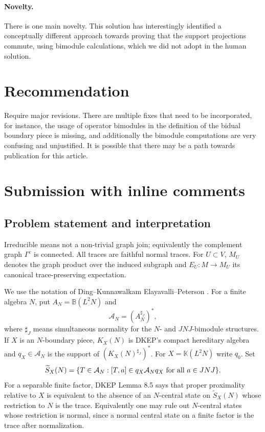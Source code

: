 \documentclass[12pt]{article}
\newcommand{\cA}{\mathcal A}
\begin{document}
\paragraph{Novelty.}
There is one main novelty. This solution has interestingly identified a conceptually different approach towards proving that the support projections commute, using bimodule calculations, which we did not adopt in the human solution. 
\section{Recommendation}
Require major revisions. There are multiple fixes that need to be incorporated, for instance, the usage of operator bimodules in the definition of the bidual boundary piece is missing, and additionally the bimodule computations  are very confusing and unjustified. It is possible that there may be a path towards publication for this article.


  \section{Submission with inline comments}


\date{}



\subsection*{Problem statement and interpretation}

Irreducible means not a non-trivial graph join; equivalently the complement
graph \(\Gamma^c\) is connected.  All traces are faithful normal traces.  For
\(U\subset V\), \(M_U\) denotes the graph product over the induced subgraph and
\(E_U:M\to M_U\) its canonical trace-preserving expectation.

We use the notation of Ding--Kunnawalkam Elayavalli--Peterson \cite{DKEP}.
For a finite algebra \(N\), put \(A_N=\mathbb B(L^2N)\) and
\[
        \cA_N=(A_N^{\sharp_J})^*,
\]
where \(\sharp_J\) means simultaneous normality for the \(N\)- and
\(JNJ\)-bimodule structures.  If \(X\) is an \(N\)-boundary piece, \(K_X(N)\)
is DKEP's compact hereditary algebra and \(q_X\in\cA_N\) is the support of
\((K_X(N)^{\sharp_J})^*\).  For \(X=\mathbb K(L^2N)\) write \(q_0\).  Set
\[
 \widetilde S_X(N)=\{T\in\cA_N:[T,a]\in q_X\cA_Nq_X\hbox{ for all }
 a\in JNJ\}.
\]
For a separable finite factor, DKEP Lemma 8.5 says that proper proximality
relative to \(X\) is equivalent to the absence of an \(N\)-central state on
\(\widetilde S_X(N)\) whose restriction to \(N\) is the trace.  Equivalently
one may rule out \(N\)-central states whose restriction is normal, since a
normal central state on a finite factor is the trace after normalization.
\end{document}
